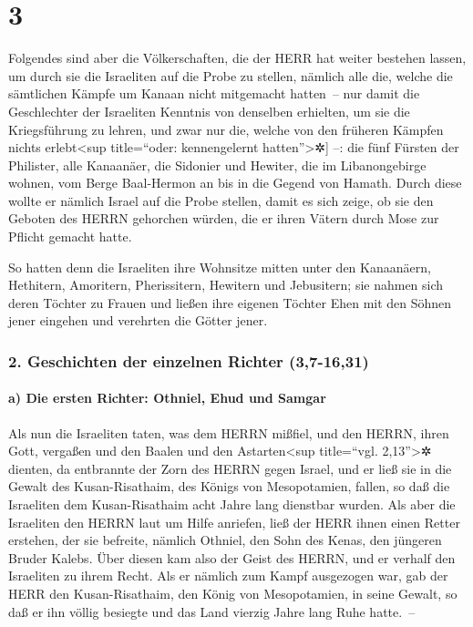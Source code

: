 \hypertarget{section-2}{%
\section{3}\label{section-2}}

Folgendes sind aber die Völkerschaften, die der HERR hat
weiter bestehen lassen, um durch sie die Israeliten auf die Probe zu
stellen, nämlich alle die, welche die sämtlichen Kämpfe um Kanaan nicht
mitgemacht hatten~-- \bibleverse{2}{[}nur damit die Geschlechter der
Israeliten Kenntnis von denselben erhielten, um sie die Kriegsführung zu
lehren, und zwar nur die, welche von den früheren Kämpfen nichts
erlebt\textless sup title=``oder: kennengelernt hatten''\textgreater✲{]}
--: die fünf Fürsten der Philister, alle Kanaanäer, die
Sidonier und Hewiter, die im Libanongebirge wohnen, vom Berge
Baal-Hermon an bis in die Gegend von Hamath. Durch diese
wollte er nämlich Israel auf die Probe stellen, damit es sich zeige, ob
sie den Geboten des HERRN gehorchen würden, die er ihren Vätern durch
Mose zur Pflicht gemacht hatte.

So hatten denn die Israeliten ihre Wohnsitze mitten unter
den Kanaanäern, Hethitern, Amoritern, Pherissitern, Hewitern und
Jebusitern; sie nahmen sich deren Töchter zu Frauen und
ließen ihre eigenen Töchter Ehen mit den Söhnen jener eingehen und
verehrten die Götter jener.

\hypertarget{geschichten-der-einzelnen-richter-37-1631}{%
\subsubsection{2. Geschichten der einzelnen Richter
(3,7-16,31)}\label{geschichten-der-einzelnen-richter-37-1631}}

\hypertarget{a-die-ersten-richter-othniel-ehud-und-samgar}{%
\paragraph{a) Die ersten Richter: Othniel, Ehud und
Samgar}\label{a-die-ersten-richter-othniel-ehud-und-samgar}}

Als nun die Israeliten taten, was dem HERRN mißfiel, und
den HERRN, ihren Gott, vergaßen und den Baalen und den
Astarten\textless sup title=``vgl. 2,13''\textgreater✲ dienten,
da entbrannte der Zorn des HERRN gegen Israel, und er ließ
sie in die Gewalt des Kusan-Risathaim, des Königs von Mesopotamien,
fallen, so daß die Israeliten dem Kusan-Risathaim acht Jahre lang
dienstbar wurden. Als aber die Israeliten den HERRN laut
um Hilfe anriefen, ließ der HERR ihnen einen Retter erstehen, der sie
befreite, nämlich Othniel, den Sohn des Kenas, den jüngeren Bruder
Kalebs. Über diesen kam also der Geist des HERRN, und er
verhalf den Israeliten zu ihrem Recht. Als er nämlich zum Kampf
ausgezogen war, gab der HERR den Kusan-Risathaim, den König von
Mesopotamien, in seine Gewalt, so daß er ihn völlig besiegte
und das Land vierzig Jahre lang Ruhe hatte.~--

